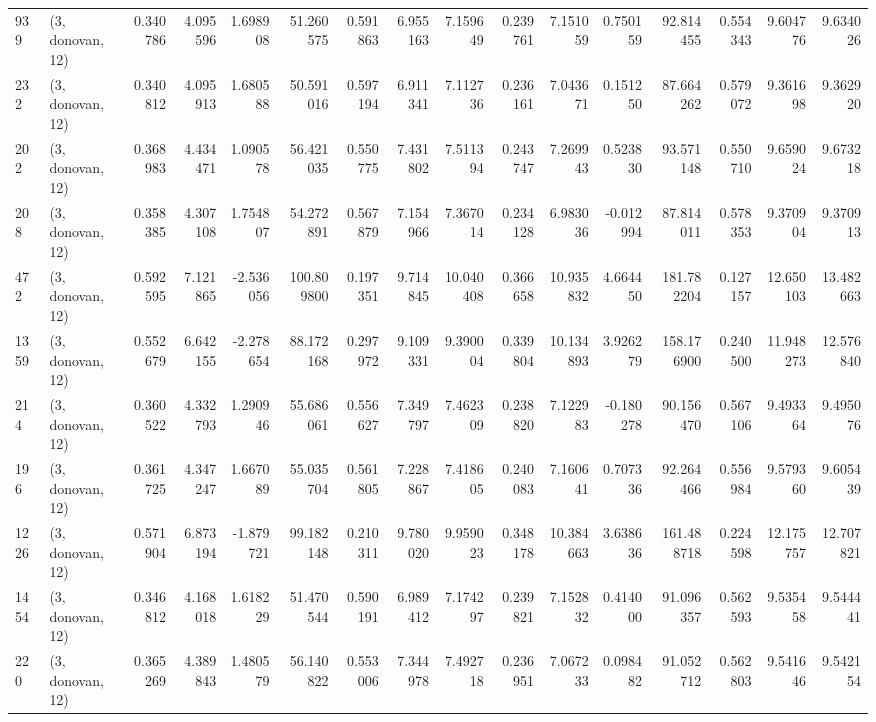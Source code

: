 \begin{tabular}{llrrrrrrrrrrrrrr}
939  &  (3, donovan, 12) &   0.340786 &   4.095596 &   1.698908 &     51.260575 &    0.591863 &    6.955163 &    7.159649 &  0.239761 &   7.151059 &   0.750159 &    92.814455 &   0.554343 &   9.604776 &   9.634026 \\
232  &  (3, donovan, 12) &   0.340812 &   4.095913 &   1.680588 &     50.591016 &    0.597194 &    6.911341 &    7.112736 &  0.236161 &   7.043671 &   0.151250 &    87.664262 &   0.579072 &   9.361698 &   9.362920 \\
202  &  (3, donovan, 12) &   0.368983 &   4.434471 &   1.090578 &     56.421035 &    0.550775 &    7.431802 &    7.511394 &  0.243747 &   7.269943 &   0.523830 &    93.571148 &   0.550710 &   9.659024 &   9.673218 \\
208  &  (3, donovan, 12) &   0.358385 &   4.307108 &   1.754807 &     54.272891 &    0.567879 &    7.154966 &    7.367014 &  0.234128 &   6.983036 &  -0.012994 &    87.814011 &   0.578353 &   9.370904 &   9.370913 \\
472  &  (3, donovan, 12) &   0.592595 &   7.121865 &  -2.536056 &    100.809800 &    0.197351 &    9.714845 &   10.040408 &  0.366658 &  10.935832 &   4.664450 &   181.782204 &   0.127157 &  12.650103 &  13.482663 \\
1359 &  (3, donovan, 12) &   0.552679 &   6.642155 &  -2.278654 &     88.172168 &    0.297972 &    9.109331 &    9.390004 &  0.339804 &  10.134893 &   3.926279 &   158.176900 &   0.240500 &  11.948273 &  12.576840 \\
214  &  (3, donovan, 12) &   0.360522 &   4.332793 &   1.290946 &     55.686061 &    0.556627 &    7.349797 &    7.462309 &  0.238820 &   7.122983 &  -0.180278 &    90.156470 &   0.567106 &   9.493364 &   9.495076 \\
196  &  (3, donovan, 12) &   0.361725 &   4.347247 &   1.667089 &     55.035704 &    0.561805 &    7.228867 &    7.418605 &  0.240083 &   7.160641 &   0.707336 &    92.264466 &   0.556984 &   9.579360 &   9.605439 \\
1226 &  (3, donovan, 12) &   0.571904 &   6.873194 &  -1.879721 &     99.182148 &    0.210311 &    9.780020 &    9.959023 &  0.348178 &  10.384663 &   3.638636 &   161.488718 &   0.224598 &  12.175757 &  12.707821 \\
1454 &  (3, donovan, 12) &   0.346812 &   4.168018 &   1.618229 &     51.470544 &    0.590191 &    6.989412 &    7.174297 &  0.239821 &   7.152832 &   0.414000 &    91.096357 &   0.562593 &   9.535458 &   9.544441 \\
220  &  (3, donovan, 12) &   0.365269 &   4.389843 &   1.480579 &     56.140822 &    0.553006 &    7.344978 &    7.492718 &  0.236951 &   7.067233 &   0.098482 &    91.052712 &   0.562803 &   9.541646 &   9.542154 \\

\end{tabular}
